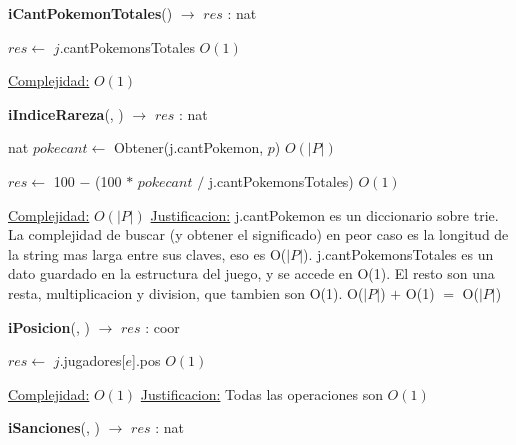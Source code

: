 \begin{Algoritmos}
\begin{algorithm}[H]
{\textbf{iCantPokemonTotales}() $\to$ $res$ : nat}
\begin{algorithmic}[1]

\State $res \gets$ $j$.cantPokemonsTotales \Comment $O(1)$

\medskip
\State \underline{Complejidad:} $O(1)$

\end{algorithmic}
\end{algorithm}


\begin{algorithm}[H]
{\textbf{iIndiceRareza}(, ) $\to$ $res$ : nat}
\begin{algorithmic}[1]

\State nat $pokecant \gets$ Obtener(j.cantPokemon, $p$) \Comment $O(|P|)$

\State $res \gets$ 100 $-$ (100 $*$ $pokecant$ $/$ j.cantPokemonsTotales) \Comment $O(1)$

\medskip
\State \underline{Complejidad:} $O(|P|)$
\State \underline{Justificacion:} j.cantPokemon es un diccionario sobre trie. La complejidad de buscar (y obtener el significado) en peor caso es la longitud de la string mas larga entre sus claves, eso es O($|P|$). j.cantPokemonsTotales es un dato guardado en la estructura del juego, y se accede en O(1). El resto son una resta, multiplicacion y division, que tambien son O(1). O($|P|$) $+$ O(1) $=$ O($|P|$)

\end{algorithmic}
\end{algorithm}


\begin{algorithm}[H]
{\textbf{iPosicion}(, ) $\to$ $res$ : coor}
\begin{algorithmic}[1]

\State $res \gets$ $j$.jugadores[$e$].pos \Comment $O(1)$

\medskip
\State \underline{Complejidad:} $O(1)$
\State \underline{Justificacion:} Todas las operaciones son $O(1)$


\end{algorithmic}
\end{algorithm}



\begin{algorithm}[H]
{\textbf{iSanciones}(, ) $\to$ $res$ : nat}
\begin{algorithmic}[1]


\end{algorithmic}
\end{algorithm}
\end{Algoritmos}
